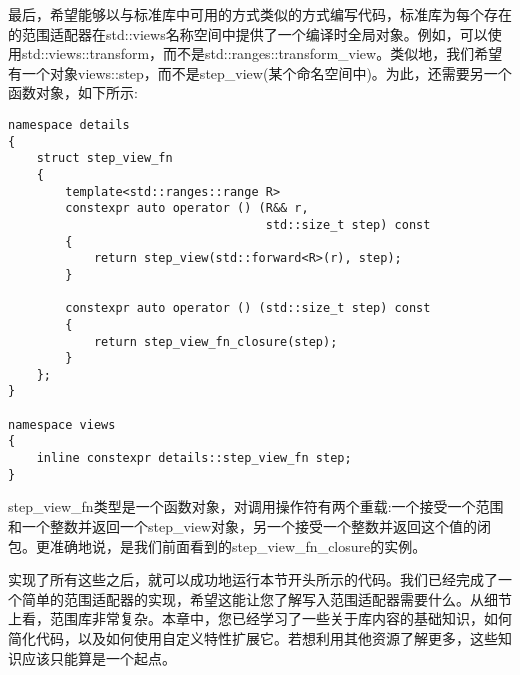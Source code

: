 最后，希望能够以与标准库中可用的方式类似的方式编写代码，标准库为每个存在的范围适配器在std::views名称空间中提供了一个编译时全局对象。例如，可以使用std::views::transform，而不是std::ranges::transform\_view。类似地，我们希望有一个对象views::step，而不是step\_view(某个命名空间中)。为此，还需要另一个函数对象，如下所示:

\begin{lstlisting}[style=styleCXX]
namespace details
{
	struct step_view_fn
	{
		template<std::ranges::range R>
		constexpr auto operator () (R&& r,
								    std::size_t step) const
		{
			return step_view(std::forward<R>(r), step);
		}
	
		constexpr auto operator () (std::size_t step) const
		{
			return step_view_fn_closure(step);
		}
	};
}

namespace views
{
	inline constexpr details::step_view_fn step;
}
\end{lstlisting}

step\_view\_fn类型是一个函数对象，对调用操作符有两个重载:一个接受一个范围和一个整数并返回一个step\_view对象，另一个接受一个整数并返回这个值的闭包。更准确地说，是我们前面看到的step\_view\_fn\_closure的实例。

实现了所有这些之后，就可以成功地运行本节开头所示的代码。我们已经完成了一个简单的范围适配器的实现，希望这能让您了解写入范围适配器需要什么。从细节上看，范围库非常复杂。本章中，您已经学习了一些关于库内容的基础知识，如何简化代码，以及如何使用自定义特性扩展它。若想利用其他资源了解更多，这些知识应该只能算是一个起点。






























